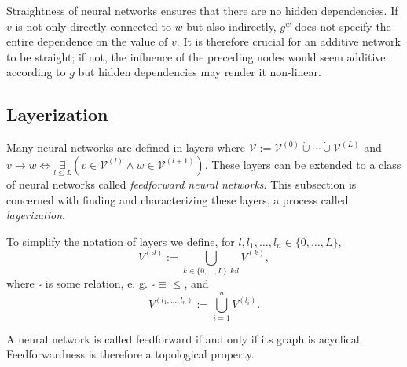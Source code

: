 \documentclass[a4paper,11pt]{report}
\begin{document}
\begin{Par}
Straightness of neural networks ensures that there are no hidden dependencies. If $v$ is not only directly connected to $w$ but also indirectly, $g^w$ does not specify the entire dependence on the value of $v$. It is therefore crucial for an additive network to be straight; if not, the influence of the preceding nodes would seem additive according to $g$ but hidden dependencies may render it non-linear.
\end{Par}

\subsection{Layerization}\label{subsec:theory-structure-forms}

\begin{Par}
Many neural networks are defined in layers where $\mathcal{V}:=\mathcal{V}^{(0)}\dot{\cup}\dotsb\dot{\cup}\mathcal{V}^{(L)}$ and $v\to w\Leftrightarrow \underset{l\le L}{\exists}\left(v\in\mathcal{V}^{(l)}\wedge w\in\mathcal{V}^{(l+1)}\right)$. These layers can be extended to a class of neural networks called \emph{feedforward neural networks}. This subsection is concerned with finding and characterizing these layers, a process called \emph{layerization}.
\end{Par}

\begin{Not}
To simplify the notation of layers we define, for $l,l_1,\dotsc,l_n\in\{0,\dotsc,L\}$,
\[
V^{(\square l)}:=\bigcup_{k\in\{0,\dotsc,L\}:k\square l}V^{(k)},
\]
where $\square$ is some relation, e. g. $\square\equiv\le$, and
\[
V^{(l_1,\dotsc,l_n)}:=\bigcup_{i=1}^nV^{(l_i)}.
\]
\end{Not}

\begin{Def}
A neural network is called feedforward if and only if its graph is acyclical. Feedforwardness is therefore a topological property.
\end{Def}
\end{document}
